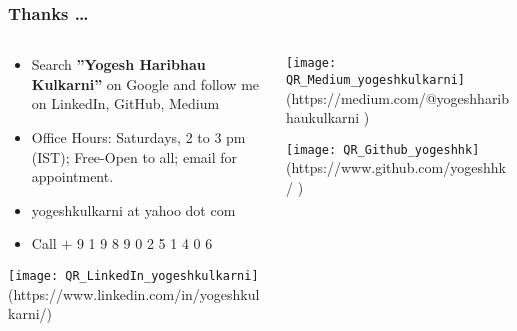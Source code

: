 \begin{frame}[fragile]\frametitle{Thanks \ldots}
\begin{columns}
    \begin{column}[T]{0.5\linewidth}
		\begin{itemize}
		\item Search {\Large \bf ''Yogesh Haribhau Kulkarni''} on Google and follow me on LinkedIn, GitHub, Medium
		\item Office Hours: Saturdays, 2 to 3 pm (IST); Free-Open to all; email for appointment.
		\item yogeshkulkarni at yahoo dot com
		\item Call $+$ 9 1 9 8 9 0 2 5 1 4 0 6
		\end{itemize}

		\begin{center}
		\texttt{[image: QR\_LinkedIn\_yogeshkulkarni]}
				{\tiny (https://www.linkedin.com/in/yogeshkulkarni/)} %
				
				
								
		\end{center}			
    \end{column}
    \begin{column}[T]{0.5\linewidth}
		\begin{center}
		\texttt{[image: QR\_Medium\_yogeshkulkarni]}
				{\tiny (https://medium.com/@yogeshharibhaukulkarni )}	 %
				
		\texttt{[image: QR\_Github\_yogeshhk]}
				{\tiny (https://www.github.com/yogeshhk/ )}	 %
								
		\end{center}	
    \end{column}
  \end{columns}
\end{frame}